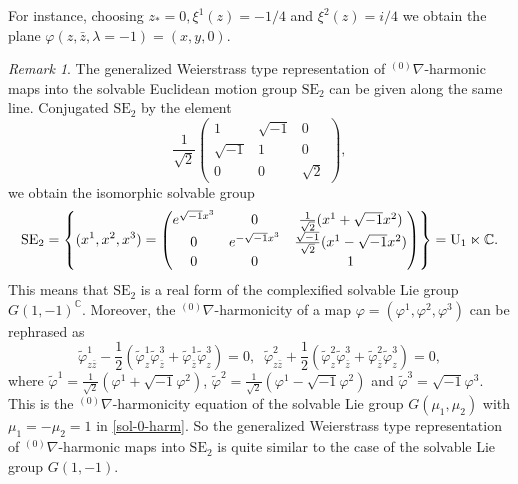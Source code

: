 \documentclass[12pt]{amsart}
\theoremstyle{definition}
\theoremstyle{remark}
\newtheorem{Remark}[Theorem]{Remark}
\numberwithin{equation}{section}
\begin{document}
 For instance, choosing $z_*=0, \xi^1 (z)=-1/4$ and  $\xi^2 (z) =i/4$  we obtain 
 the plane $\varphi(z,\bar{z}, {\lambda}=-1)=(x,y,0)$.
\begin{Remark}
 The generalized Weierstrass type representation of 
 ${{}^{(0)}\nabla}$-harmonic maps into the solvable Euclidean motion group $\mathrm{SE}_2$ 
 can be given along the same line.
 Conjugated  $\mathrm{SE}_2$ by the element
\begin{equation*}
\frac{1}{\sqrt{2}}
 \begin{pmatrix} 
 1 &  \sqrt{-1} & 0 \\ 
 \sqrt{-1} &  1& 0 \\ 
 0 & 0 & \sqrt{2}
 \end{pmatrix},
\end{equation*}
 we obtain the isomorphic solvable group
\begin{equation*}
 \mathrm{SE}_2
 =
 \left\{
 (x^1, x^2, x^3) = 
 \begin{pmatrix}
 e^{\sqrt{-1} x^3} & 0 & \frac{1}{\sqrt{2}} (x^1 + \sqrt{-1} x^2) \\
 0 & e^{- \sqrt{-1} x^3} & \frac{\sqrt{-1}}{\sqrt{2}} (x^1 - \sqrt{-1} x^2) \\
 0 &0 & 1
 \end{pmatrix}
\right\} = {\rm U}_1 \ltimes \mathbb C.
\end{equation*}
 This means that $\mathrm{SE}_2$ is a real form of 
 the complexified solvable Lie group $G(1, -1)^{\mathbb C}$.
 Moreover, the ${{}^{(0)}\nabla}$-harmonicity of a map 
 $\varphi=(\varphi^1, \varphi^2, \varphi^3)$ can be rephrased as 
\begin{equation}\label{eq:SE2-rephrased}
 \tilde \varphi^1_{z\bar z} - \frac{1}{2}(\tilde \varphi^1_{z}\tilde \varphi^3_{\bar z}+\tilde \varphi^1_{\bar z}\tilde \varphi^3_z)=0,\; \;
  \tilde \varphi^2_{z\bar z} + \frac{1}{2}(\tilde \varphi^2_{z}\tilde \varphi^3_{\bar z}+\tilde \varphi^2_{\bar z}\tilde \varphi^3_z)=0,
\end{equation}
 where 
 $\tilde \varphi^1= \frac{1}{\sqrt{2}} (\varphi^1 + \sqrt{-1}\varphi^2)$,
 $\tilde \varphi^2= \frac{1}{\sqrt{2}} (\varphi^1 - \sqrt{-1}\varphi^2)$ 
and $\tilde \varphi^3 =\sqrt{-1} \varphi^3$.
 This is the ${{}^{(0)}\nabla}$-harmonicity equation of the solvable Lie group 
 $G(\mu_1, \mu_2)$ with $\mu_1 = -\mu_2 =1$ in \eqref{sol-0-harm}.
 So the generalized Weierstrass type representation of 
 ${{}^{(0)}\nabla}$-harmonic maps into $\mathrm{SE}_2$ is quite similar to 
 the case of the solvable Lie group $G(1, -1)$. 
\end{Remark} 
\end{document}
